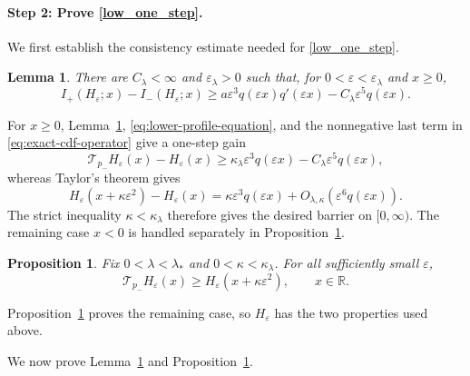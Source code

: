 \documentclass[12pt]{amsart}
\numberwithin{equation}{section}
\theoremstyle{plain}
\newtheorem{proposition}[theorem]{Proposition}
\newtheorem{lemma}[theorem]{Lemma}
\theoremstyle{definition}
\begin{document}
\paragraph*{Step 2: Prove \eqref{low_one_step}.}
We first establish the consistency estimate needed for \eqref{low_one_step}.

\begin{lemma}
\label{lem:hard-edge-consistency}
There are $C_{\lambda}<\infty$ and $\varepsilon_{\lambda}>0$ such that, for
$0<\varepsilon<\varepsilon_{\lambda}$ and $x\ge0$,
\begin{equation}
 I_+(H_\varepsilon;x)-I_-(H_\varepsilon;x)
 \ge a\varepsilon^3q(\varepsilon x)q'(\varepsilon x)
      -C_{\lambda}\varepsilon^5q(\varepsilon x).
 \label{eq:hard-edge-one-sided-consistency}
\end{equation}
\end{lemma}

For $x\ge0$, Lemma~\ref{lem:hard-edge-consistency},
\eqref{eq:lower-profile-equation}, and the nonnegative last term in
\eqref{eq:exact-cdf-operator} give a one-step gain
\[
 \mathcal T_{p_-}H_\varepsilon(x)-H_\varepsilon(x)
 \ge \kappa_{\lambda}\varepsilon^3q(\varepsilon x)
      -C_{\lambda}\varepsilon^5q(\varepsilon x),
\]
whereas Taylor's theorem gives
\[
 H_\varepsilon(x+\kappa\varepsilon^2)-H_\varepsilon(x)
 =\kappa\varepsilon^3q(\varepsilon x)
  +O_{\lambda,\kappa}(\varepsilon^6q(\varepsilon x)).
\]
The strict inequality $\kappa<\kappa_{\lambda}$ therefore gives the desired
barrier on $[0,\infty)$. The remaining case $x<0$ is handled separately in
Proposition~\ref{prop:hard-edge-barrier}.

\begin{proposition}
\label{prop:hard-edge-barrier}
Fix $0<\lambda<\lambda_*$ and $0<\kappa<\kappa_{\lambda}$.  For all sufficiently small
$\varepsilon$,
\begin{equation*}
 \mathcal T_{p_-}H_\varepsilon(x)
 \ge H_\varepsilon(x+\kappa\varepsilon^2),
 \qquad x\in\mathbb R.
\end{equation*}
\end{proposition}

Proposition~\ref{prop:hard-edge-barrier} proves the remaining case, so $H_\varepsilon$ has the two properties used above.

We now prove Lemma~\ref{lem:hard-edge-consistency} and Proposition~\ref{prop:hard-edge-barrier}.
\end{document}
